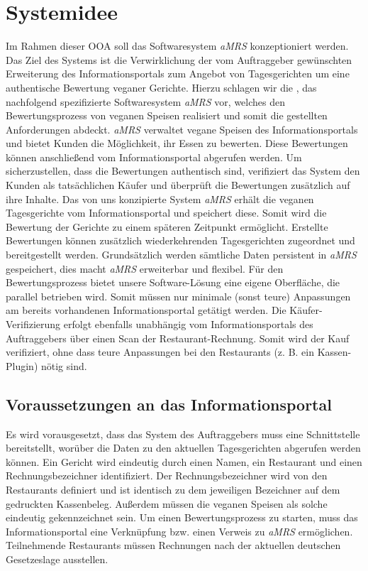 \section{Systemidee}

Im Rahmen dieser \ac{OOA} soll das Softwaresystem \textit{\ac{aMRS}} konzeptioniert werden.
\newparagraph
Das Ziel des Systems ist die Verwirklichung der vom Auftraggeber gewünschten Erweiterung des Informationsportals zum Angebot von Tagesgerichten um eine authentische Bewertung veganer Gerichte. 
Hierzu schlagen wir die \textit{\vFKW}, das nachfolgend spezifizierte Softwaresystem \textit{\ac{aMRS}} vor, welches den Bewertungsprozess von veganen Speisen realisiert und somit die gestellten Anforderungen abdeckt.
\textit{\ac{aMRS}} verwaltet vegane Speisen des Informationsportals und bietet Kunden die Möglichkeit, ihr Essen zu bewerten.
Diese Bewertungen können anschließend vom Informationsportal abgerufen werden.
Um sicherzustellen, dass die Bewertungen authentisch sind, verifiziert das System den Kunden als tatsächlichen Käufer und überprüft die Bewertungen zusätzlich auf ihre Inhalte.
\newparagraph
Das von uns konzipierte System \textit{\ac{aMRS}} erhält die veganen Tagesgerichte vom Informationsportal und speichert diese.
Somit wird die Bewertung der Gerichte zu einem späteren Zeitpunkt ermöglicht.
Erstellte Bewertungen können zusätzlich wiederkehrenden Tagesgerichten zugeordnet und bereitgestellt werden. Grundsätzlich werden sämtliche Daten persistent in \textit{\ac{aMRS}} gespeichert, dies macht \textit{\ac{aMRS}} erweiterbar und flexibel.
\newparagraph
Für den Bewertungsprozess bietet unsere Software-Lösung eine eigene Oberfläche, die parallel betrieben wird.
Somit müssen nur minimale (sonst teure) Anpassungen am bereits vorhandenen Informationsportal getätigt werden.
Die Käufer-Verifizierung erfolgt ebenfalls unabhängig vom Informationsportals des Auftraggebers über einen Scan der Restaurant-Rechnung.
Somit wird der Kauf verifiziert, ohne dass teure Anpassungen bei den Restaurants (z. B. ein Kassen-Plugin) nötig sind.

\subsection*{Voraussetzungen an das Informationsportal}
Es wird vorausgesetzt, dass das System des Auftraggebers muss eine Schnittstelle bereitstellt, worüber die Daten zu den aktuellen Tagesgerichten abgerufen werden können.
Ein Gericht wird eindeutig durch einen Namen, ein Restaurant und einen Rechnungsbezeichner identifiziert.
Der Rechnungsbezeichner wird von den Restaurants definiert und ist identisch zu dem jeweiligen Bezeichner auf dem gedruckten Kassenbeleg.
Außerdem müssen die veganen Speisen als solche eindeutig gekennzeichnet sein.
\newparagraph
Um einen Bewertungsprozess zu starten, muss das Informationsportal eine Verknüpfung bzw. einen Verweis zu \textit{\ac{aMRS}} ermöglichen.
Teilnehmende Restaurants müssen Rechnungen nach der aktuellen deutschen Gesetzeslage ausstellen.

